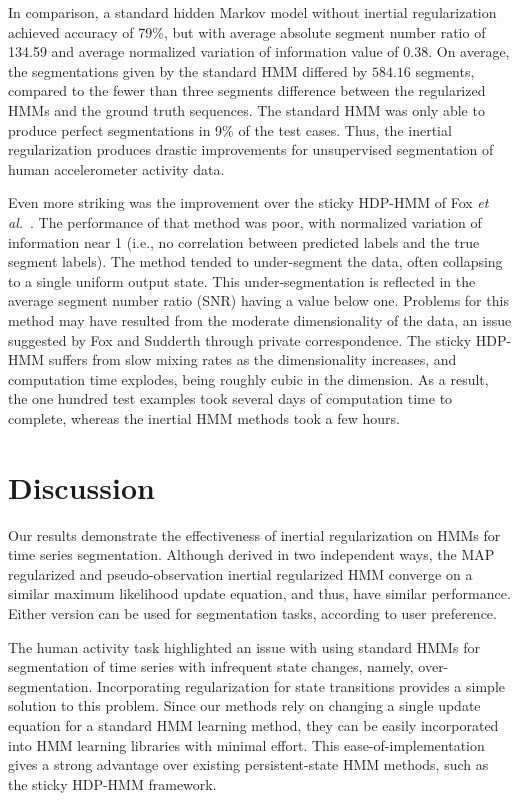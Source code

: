 \documentclass[letterpaper]{article}
\begin{document}
In comparison, a standard hidden Markov model without inertial regularization achieved accuracy of 79\%, but with average absolute segment number ratio of 134.59 and average normalized variation of information value of $0.38$. On average, the segmentations given by the standard HMM differed by $584.16$ segments, compared to the fewer than three segments difference between the regularized HMMs and the ground truth sequences. The standard HMM was only able to produce perfect segmentations in 9\% of the test cases. Thus, the inertial regularization produces drastic improvements for unsupervised segmentation of human accelerometer activity data.

Even more striking was the improvement over the sticky HDP-HMM of Fox \emph{et al.}~\cite{fox2011sticky}. The performance of that method was poor, with normalized variation of information near 1 (i.e., no correlation between predicted labels and the true segment labels). The method tended to under-segment the data, often collapsing to a single uniform output state. This under-segmentation is reflected in the average segment number ratio (SNR) having a value below one. Problems for this method may have resulted from the moderate dimensionality of the data, an issue suggested by Fox and Sudderth through private correspondence. The sticky HDP-HMM suffers from slow mixing rates as the dimensionality increases, and computation time explodes, being roughly cubic in the dimension. As a result, the one hundred test examples took several days of computation time to complete, whereas the inertial HMM methods took a few hours. 

\section{Discussion}

Our results demonstrate the effectiveness of inertial regularization on HMMs for time series segmentation. Although derived in two independent ways, the MAP regularized and pseudo-observation inertial regularized HMM converge on a similar maximum likelihood update equation, and thus, have similar performance. Either version can be used for segmentation tasks, according to user preference. 

The human activity task highlighted an issue with using standard HMMs for segmentation of time series with infrequent state changes, namely, over-segmentation. Incorporating regularization for state transitions provides a simple solution to this problem. Since our methods rely on changing a single update equation for a standard HMM learning method, they can be easily incorporated into HMM learning libraries with minimal effort. This ease-of-implementation gives a strong advantage over existing persistent-state HMM methods, such as the sticky HDP-HMM framework.
\end{document}
